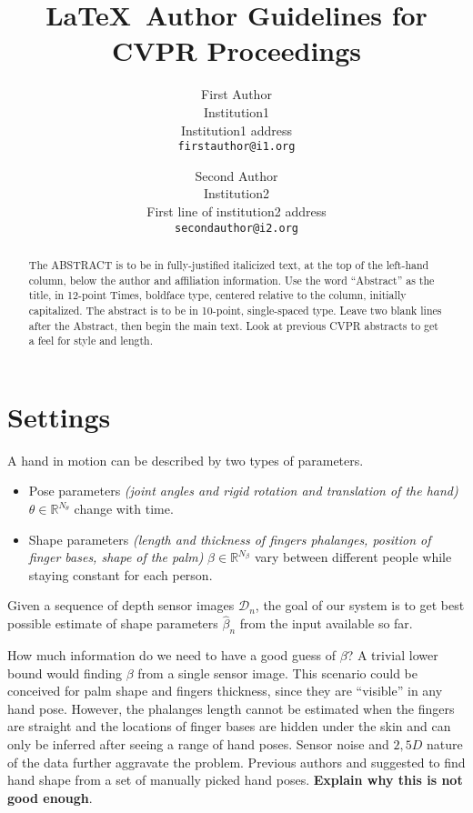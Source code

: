 \documentclass[10pt,twocolumn,letterpaper]{article}
\begin{document}
\title{\LaTeX\ Author Guidelines for CVPR Proceedings}

\author{First Author\\
Institution1\\
Institution1 address\\
{\tt\small firstauthor@i1.org}
\and
Second Author\\
Institution2\\
First line of institution2 address\\
{\tt\small secondauthor@i2.org}
}

\maketitle


\begin{abstract}
   The ABSTRACT is to be in fully-justified italicized text, at the top
   of the left-hand column, below the author and affiliation
   information. Use the word ``Abstract'' as the title, in 12-point
   Times, boldface type, centered relative to the column, initially
   capitalized. The abstract is to be in 10-point, single-spaced type.
   Leave two blank lines after the Abstract, then begin the main text.
   Look at previous CVPR abstracts to get a feel for style and length.
\end{abstract}

\section{Settings}
A hand in motion can be described by two types of parameters.
\begin{itemize}
\item Pose parameters \textit{(joint angles and rigid rotation and translation of the hand)} $\theta \in \mathbb{R}^{N_{\theta}}$ change with time. 
\item Shape parameters \textit{(length and thickness of fingers phalanges, position of finger bases, shape of the palm)} $\beta \in \mathbb{R}^{N_{\beta}}$ vary between different people while staying constant for each person. 
\end{itemize}
Given a sequence of depth sensor images $\mathcal{D}_n$, the goal of our system is to get best possible estimate of shape parameters $\hat{\beta}_n$ from the input available so far.

How much information do we need to have a good guess of $\beta$? A trivial lower bound would finding $\beta$ from a single sensor image. This scenario could be conceived for palm shape and fingers thickness, since they are ``visible'' in any hand pose. However, the phalanges length cannot be estimated when the fingers are straight and the locations of finger bases are hidden under the skin and can only be inferred after seeing a range of hand poses. Sensor noise and $2,5 D$ nature of the data further aggravate the problem. 
Previous authors \cite{joseph2016fits} and \cite{tkach2016sphere} suggested to find hand shape from a set of manually picked hand poses. \textbf{\color{accent} Explain why this is not good enough}.
\end{document}
